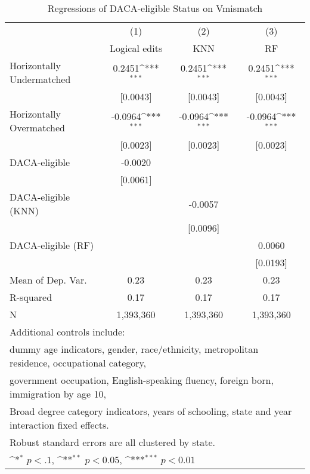 \begin{table}[htbp]\centering
\def\sym#1{\ifmmode^{#1}\else\(^{#1}\)\fi}
\caption{Regressions of DACA-eligible Status on Vmismatch}
\begin{tabular}{l*{3}{c}}
\toprule
                    &\multicolumn{1}{c}{(1)}         &\multicolumn{1}{c}{(2)}         &\multicolumn{1}{c}{(3)}         \\
                    &Logical edits         &         KNN         &          RF         \\
\midrule
Horizontally Undermatched&      0.2451\sym{***}&      0.2451\sym{***}&      0.2451\sym{***}\\
                    &    [0.0043]         &    [0.0043]         &    [0.0043]         \\
\addlinespace
Horizontally Overmatched&     -0.0964\sym{***}&     -0.0964\sym{***}&     -0.0964\sym{***}\\
                    &    [0.0023]         &    [0.0023]         &    [0.0023]         \\
\addlinespace
DACA-eligible       &     -0.0020         &                     &                     \\
                    &    [0.0061]         &                     &                     \\
\addlinespace
DACA-eligible (KNN) &                     &     -0.0057         &                     \\
                    &                     &    [0.0096]         &                     \\
\addlinespace
DACA-eligible (RF)  &                     &                     &      0.0060         \\
                    &                     &                     &    [0.0193]         \\
\midrule
Mean of Dep. Var.   &        0.23         &        0.23         &        0.23         \\
R-squared           &        0.17         &        0.17         &        0.17         \\
N                   &   1,393,360         &   1,393,360         &   1,393,360         \\
\bottomrule
\multicolumn{4}{l}{\footnotesize Additional controls include:}\\
\multicolumn{4}{l}{\footnotesize dummy age indicators, gender, race/ethnicity, metropolitan residence, occupational category,}\\
\multicolumn{4}{l}{\footnotesize government occupation, English-speaking fluency, foreign born, immigration by age 10,}\\
\multicolumn{4}{l}{\footnotesize Broad degree category indicators, years of schooling, state and year interaction fixed effects.}\\
\multicolumn{4}{l}{\footnotesize Robust standard errors are all clustered by state.}\\
\multicolumn{4}{l}{\footnotesize \sym{*} \(p<.1\), \sym{**} \(p<0.05\), \sym{***} \(p<0.01\)}\\
\end{tabular}
\end{table}
